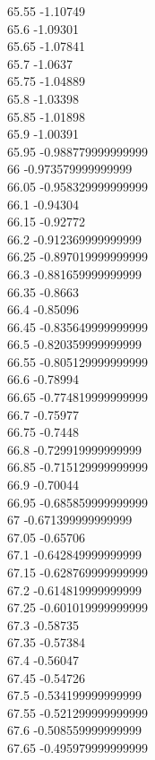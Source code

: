{65.55	-1.10749\\
65.6	-1.09301\\
65.65	-1.07841\\
65.7	-1.0637\\
65.75	-1.04889\\
65.8	-1.03398\\
65.85	-1.01898\\
65.9	-1.00391\\
65.95	-0.988779999999999\\
66	-0.973579999999999\\
66.05	-0.958329999999999\\
66.1	-0.94304\\
66.15	-0.92772\\
66.2	-0.912369999999999\\
66.25	-0.897019999999999\\
66.3	-0.881659999999999\\
66.35	-0.8663\\
66.4	-0.85096\\
66.45	-0.835649999999999\\
66.5	-0.820359999999999\\
66.55	-0.805129999999999\\
66.6	-0.78994\\
66.65	-0.774819999999999\\
66.7	-0.75977\\
66.75	-0.7448\\
66.8	-0.729919999999999\\
66.85	-0.715129999999999\\
66.9	-0.70044\\
66.95	-0.685859999999999\\
67	-0.671399999999999\\
67.05	-0.65706\\
67.1	-0.642849999999999\\
67.15	-0.628769999999999\\
67.2	-0.614819999999999\\
67.25	-0.601019999999999\\
67.3	-0.58735\\
67.35	-0.57384\\
67.4	-0.56047\\
67.45	-0.54726\\
67.5	-0.534199999999999\\
67.55	-0.521299999999999\\
67.6	-0.508559999999999\\
67.65	-0.495979999999999\\
}

